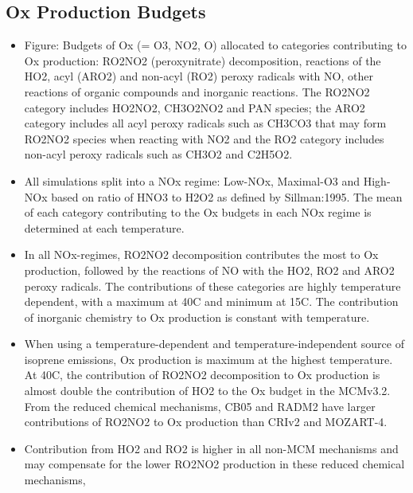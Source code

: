 \documentclass[11pt,a4paper]{article}
\begin{document}
\subsection{Ox Production Budgets}
\begin{itemize}
    \item Figure: Budgets of Ox (= O3, NO2, O) allocated to categories contributing to Ox production: RO2NO2 (peroxynitrate) decomposition, reactions of the HO2, acyl (ARO2) and non-acyl (RO2) peroxy radicals with NO, other reactions of organic compounds and inorganic reactions. The RO2NO2 category includes HO2NO2, CH3O2NO2 and PAN species; the ARO2 category includes all acyl peroxy radicals such as CH3CO3 that may form RO2NO2 species when reacting with NO2 and the RO2 category includes non-acyl peroxy radicals such as CH3O2 and C2H5O2.
    \item All simulations split into a NOx regime: Low-NOx, Maximal-O3 and High-NOx based on ratio of HNO3 to H2O2 as defined by Sillman:1995. The mean of each category contributing to the Ox budgets in each NOx regime is determined at each temperature.
    \item In all NOx-regimes, RO2NO2 decomposition contributes the most to Ox production, followed by the reactions of NO with the HO2, RO2 and ARO2 peroxy radicals. The contributions of these categories are highly temperature dependent, with a maximum at 40C and minimum at 15C. The contribution of inorganic chemistry to Ox production is constant with temperature.
    \item When using a temperature-dependent and temperature-independent source of isoprene emissions, Ox production is maximum at the highest temperature. At 40C, the contribution of RO2NO2 decomposition to Ox production is almost double the contribution of HO2 to the Ox budget in the MCMv3.2. From the reduced chemical mechanisms, CB05 and RADM2 have larger contributions of RO2NO2 to Ox production than CRIv2 and MOZART-4.
    \item Contribution from HO2 and RO2 is higher in all non-MCM mechanisms and may compensate for the lower RO2NO2 production in these reduced chemical mechanisms, 
\end{itemize}
\end{document}
